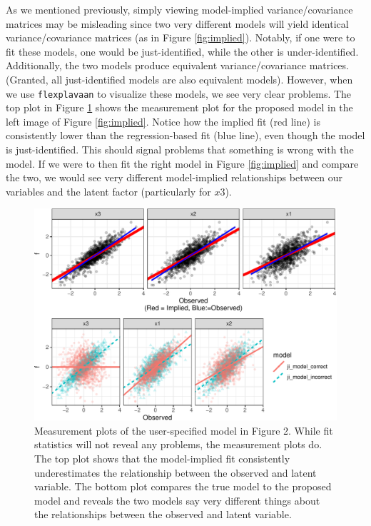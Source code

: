 \documentclass[
  english,
  man]{apa6}
\begin{document}
As we mentioned previously, simply viewing model-implied variance/covariance matrices may be misleading since two very different models will yield identical variance/covariance matrices (as in Figure \ref{fig:implied}). Notably, if one were to fit these models, one would be just-identified, while the other is under-identified. Additionally, the two models produce equivalent variance/covariance matrices. (Granted, all just-identified models are also equivalent models). However, when we use \texttt{flexplavaan} to visualize these models, we see very clear problems. The top plot in Figure \ref{fig:equivalentmodels} shows the measurement plot for the proposed model in the left image of Figure \ref{fig:implied}. Notice how the implied fit (red line) is consistently lower than the regression-based fit (blue line), even though the model is just-identified. This should signal problems that something is wrong with the model. If we were to then fit the right model in Figure \ref{fig:implied} and compare the two, we would see very different model-implied relationships between our variables and the latent factor (particularly for \(x3\)).

\begin{figure}

{\centering \includegraphics[width=0.9\linewidth]{flexplavaan_draft_files/figure-latex/equivalentmodels-1} 

}

\caption{Measurement plots of the user-specified model in Figure 2. While fit statistics will not reveal any problems, the measurement plots do. The top plot shows that the model-implied fit consistently underestimates the relationship between the observed and latent variable. The bottom plot compares the true model to the proposed model and reveals the two models say very different things about the relationships between the observed and latent variable.}\label{fig:equivalentmodels}
\end{figure}
\end{document}
